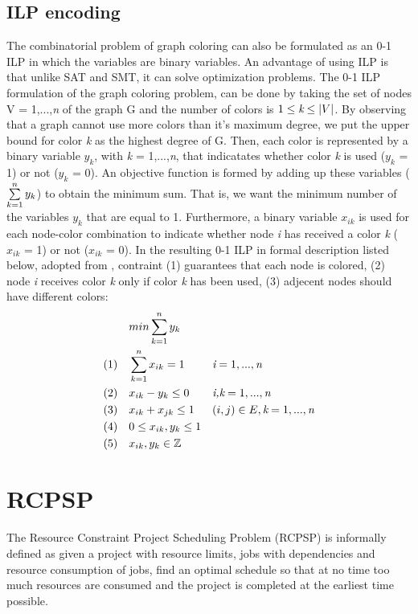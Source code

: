 \documentclass{sig-alternate}
\begin{document}
\subsection{ILP encoding}
The combinatorial problem of graph coloring can also be formulated as an 0-1 ILP in which the variables are binary variables. 
An advantage of using ILP is that unlike SAT and SMT, it can solve optimization problems. 
The 0-1 ILP formulation of the graph coloring problem,
can be done by taking the set of nodes V = {1,...,\emph{n}} of the graph G and the number of 
colors is $1 \leq \emph{k} \leq |V|$. By observing that a graph cannot use more colors than it's maximum 
degree, we put the upper bound for color \emph{k} as the highest degree of G.
Then, each color is represented by a binary variable \emph{$y_k$}, 
with \emph{k} = 1,...,\emph{n}, that indicatates whether color \emph{k} is used (\emph{$y_k$} = 1) or 
not (\emph{$y_k$} = 0). An objective function is formed by adding up these variables 
($\sum\limits_{k=1}^n \emph{$y_k$}$) to obtain the minimum sum. That is, we want the minimum number 
of the variables \emph{$y_k$} that are equal to 1. Furthermore, a binary variable \emph{$x_{ik}$} is 
used for each node-color combination to indicate whether node \emph{i} has received a color \emph{k} 
(\emph{$x_{ik}$} = 1) or not (\emph{$x_{ik}$} = 0). In the resulting 0-1 ILP in formal description 
listed below, adopted from \cite{faigle2002mathprogramming}, contraint (1) guarantees that each node 
is colored, (2) node \emph{i} receives color \emph{k} only if color \emph{k} has been used, (3) adjecent nodes should have different colors:
\begin{subequations}
\begin{align*}
        & & & min \sum\limits_{k=1}^n \emph{$y_k$} & & \\
        &  (1) & & \sum\limits_{k=1}^n \emph{$x_{ik}$} = 1 & & \emph{i} = 1,...,\emph{n} \\
        &  (2) & & \emph{$x_{ik}$} - \emph{$y_k$} \leq 0 & & \emph{i,k} = 1,...,\emph{n} \\
        &  (3) & &  \emph{$x_{ik}$} + \emph{$x_{jk}$} \leq 1 & & (i,j) \in E, \emph{k} = 1,...,\emph{n} \\
        &  (4) & & 0 \leq \emph{$x_{ik}$}, \emph{$y_k$} \leq 1 & & \\
        &  (5) & & \emph{$x_{ik}$}, \emph{$y_k$} \in \mathbb{Z} & &
\end{align*}
\end{subequations}

\section{RCPSP}
The Resource Constraint Project Scheduling Problem (RCPSP) is informally defined as given a project with resource limits, jobs with dependencies and resource consumption of jobs, find an optimal schedule so that at no time too much resources are consumed and the project is completed at the earliest time possible.
\end{document}

